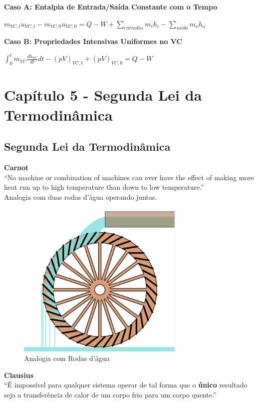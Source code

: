 \documentclass[a4paper, 12pt]{article}
\begin{document}
\textbf{Caso A: Entalpia de Entrada/Saída Constante com o Tempo}\\
	\begin{center}
		\large
		$ m_{VC,t}u_{VC,t} - m_{VC,0}u_{VC,0} = Q - W + \sum\limits_{entradas}m_ih_i - \sum\limits_{saida}m_oh_o $
	\end{center}

\textbf{Caso B: Propriedades Intensivas Uniformes no VC}\\
	\begin{center}
		\large
		$ \int_{0}^{t} m_{VC}\frac{dh_{VC}}{dt}dt - (pV)_{VC,t} + (pV)_{VC,0} = Q - W$
	\end{center}


\newpage
\section{Capítulo 5 - Segunda Lei da Termodinâmica}
\subsection{Segunda Lei da Termodinâmica}
\textbf{Carnot}\\
“No machine or combination of machines
can ever have the effect of making more
heat run up to high temperature than
down to low temperature.”\\

Analogia com duas rodas d’água
operando juntas.

	\begin{figure}[h]
		\includegraphics[width = 8cm]{cc.png}
		\centering
		\caption{Analogia com Rodas d'água}
	\end{figure}

\textbf{Clausius}\\
“É impossível para qualquer
sistema operar de tal forma que o
\textbf{único} resultado seja a transferência
de calor de um corpo frio para um
corpo quente.”
\end{document}
